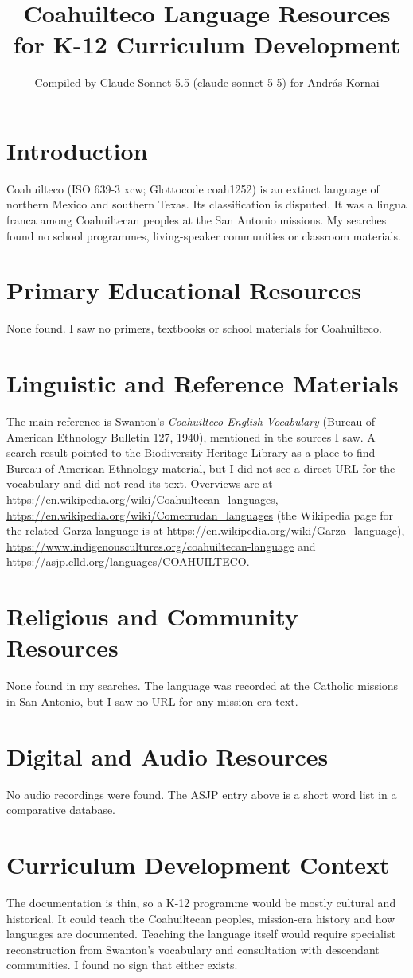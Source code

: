 \documentclass[12pt]{article}
\title{Coahuilteco Language Resources for K-12 Curriculum Development}
\author{Compiled by Claude Sonnet 5.5 (claude-sonnet-5-5) for Andr\'as Kornai}
\date{}
\begin{document}
\maketitle

\section{Introduction}
Coahuilteco (ISO 639-3 xcw; Glottocode coah1252) is an extinct language of northern Mexico and southern Texas. Its classification is disputed. It was a lingua franca among Coahuiltecan peoples at the San Antonio missions. My searches found no school programmes, living-speaker communities or classroom materials.

\section{Primary Educational Resources}
None found. I saw no primers, textbooks or school materials for Coahuilteco.

\section{Linguistic and Reference Materials}
The main reference is Swanton's \emph{Coahuilteco-English Vocabulary} (Bureau of American Ethnology Bulletin 127, 1940), mentioned in the sources I saw. A search result pointed to the Biodiversity Heritage Library as a place to find Bureau of American Ethnology material, but I did not see a direct URL for the vocabulary and did not read its text. Overviews are at \url{https://en.wikipedia.org/wiki/Coahuiltecan_languages}, \url{https://en.wikipedia.org/wiki/Comecrudan_languages} (the Wikipedia page for the related Garza language is at \url{https://en.wikipedia.org/wiki/Garza_language}), \url{https://www.indigenouscultures.org/coahuiltecan-language} and \url{https://asjp.clld.org/languages/COAHUILTECO}.

\section{Religious and Community Resources}
None found in my searches. The language was recorded at the Catholic missions in San Antonio, but I saw no URL for any mission-era text.

\section{Digital and Audio Resources}
No audio recordings were found. The ASJP entry above is a short word list in a comparative database.

\section{Curriculum Development Context}
The documentation is thin, so a K-12 programme would be mostly cultural and historical. It could teach the Coahuiltecan peoples, mission-era history and how languages are documented. Teaching the language itself would require specialist reconstruction from Swanton's vocabulary and consultation with descendant communities. I found no sign that either exists.
\end{document}
